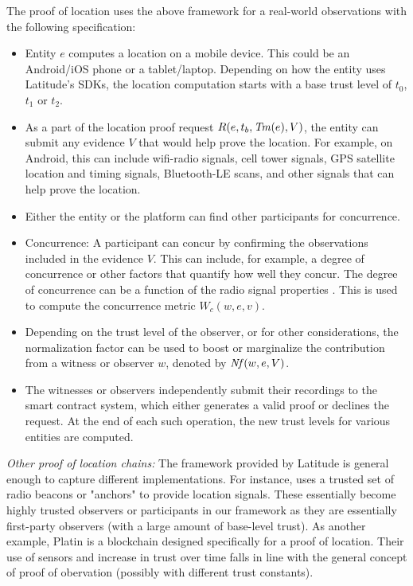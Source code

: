 The proof of location uses the above framework for a real-world observations with the following specification:
\begin{itemize}
    \item Entity $e$ computes a location on a mobile device. This could be an Android/iOS phone or a tablet/laptop.
        Depending on how the entity uses Latitude's SDKs, the location computation starts with a base trust level of
        $t_0$, $t_1$ or $t_2$.
    \item As a part of the location proof request $R(e, t_b, \mathit{Tm}(e), V)$, the entity can submit any evidence $V$ that would help
        prove the location. For example, on Android, this can include wifi-radio signals, cell tower signals, GPS
        satellite location and timing signals, Bluetooth-LE scans, and other signals that can help prove the location.
    \item Either the entity or the platform can find other participants for concurrence.
    \item Concurrence: A participant can concur by confirming the observations included in the evidence $V$. This can
        include, for example, a degree of concurrence or other factors that quantify how well they concur. The degree of
        concurrence can be a function of the radio signal properties \cite{mishra_secure, Mathur_2011}. This is used to
        compute the concurrence metric $W_c(w, e, v)$.
    \item Depending on the trust level of the observer, or for other considerations, the normalization factor can be
        used to boost or marginalize the contribution from a witness or observer $w$, denoted by $\mathit{Nf}(w, e, V)$.
    \item The witnesses or observers independently submit their recordings to the smart contract system, which either
        generates a valid proof or declines the request. At the end of each such operation, the new trust levels for
        various entities are computed.
\end{itemize}

\noindent
{\em Other proof of location chains:}
The framework provided by Latitude is general enough to capture different implementations. For instance, \cite{foam}
uses a trusted set of radio beacons or "anchors" to provide location signals. These essentially become highly trusted
observers or participants in our framework as they are essentially first-party observers (with a large amount of
base-level trust). As another example, Platin is a blockchain designed specifically for a proof of location. Their use
of sensors and increase in trust over time falls in line with the general concept of proof of obervation (possibly with
different trust constants).


